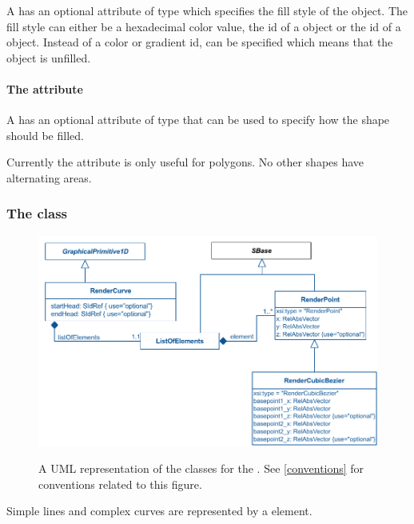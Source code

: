 A \GraphicalPrimitiveTwoD has an optional attribute  of type
 which specifies 
the fill style of the object. The fill style can either be a hexadecimal
color value, the id of a \ColorDefinition object or the id of a \GradientBase
object. 
Instead of a color or gradient id,  can be specified
 which means that the object is unfilled.


\paragraph{The \fixttspace{} attribute}

A \GraphicalPrimitiveTwoD has an optional attribute  of
type \FillRule that can be used to specify how the shape should be filled. 

Currently the  attribute is only useful for polygons. No other shapes have alternating areas.

\subsubsection{The  class}
\label{rendercurve-class}
\begin{figure}[h!]
  \centering
  \includegraphics{images/render-curve-uml}\\
  \caption{A UML representation of the \RenderCurve classes for the \RenderPackage.  See \ref{conventions} for conventions related to this figure. }
  \label{fig:curve_render_uml}
\end{figure}

Simple lines and complex curves are represented by a \RenderCurve element. 

